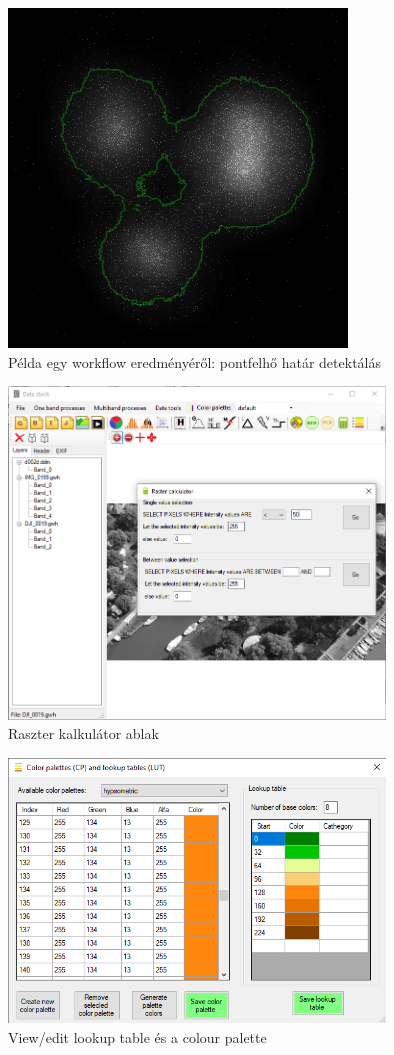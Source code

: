 \documentclass[a4paper,12pt]{article}
\begin{document}
\begin{figure}
	\centering
	\includegraphics[width=9cm]{cloud.png}
	\caption{Példa egy workflow eredményéről: pontfelhő határ detektálás}
	\label{fig:cloud}
\end{figure}

\begin{figure}
	\centering
	\includegraphics[width=10cm]{rastcalc.png}
	\caption{Raszter kalkulátor ablak}
	\label{fig:rastcalc}
\end{figure}

\begin{figure}
	\centering
	\includegraphics[width=10cm]{lut.png}
	\caption{View/edit lookup table és a colour palette}
	\label{fig:lut}
\end{figure}
\end{document}
